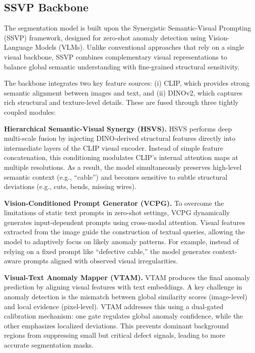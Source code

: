 \documentclass[11pt]{article}
\begin{document}
\subsection{SSVP Backbone}

The segmentation model is built upon the Synergistic Semantic-Visual Prompting (SSVP) framework, designed for zero-shot anomaly detection using Vision-Language Models (VLMs). Unlike conventional approaches that rely on a single visual backbone, SSVP combines complementary visual representations to balance global semantic understanding with fine-grained structural sensitivity.

The backbone integrates two key feature sources: (i) CLIP, which provides strong semantic alignment between images and text, and (ii) DINOv2, which captures rich structural and texture-level details. These are fused through three tightly coupled modules:

\textbf{Hierarchical Semantic-Visual Synergy (HSVS).}
HSVS performs deep multi-scale fusion by injecting DINO-derived structural features directly into intermediate layers of the CLIP visual encoder. Instead of simple feature concatenation, this conditioning modulates CLIP’s internal attention maps at multiple resolutions. As a result, the model simultaneously preserves high-level semantic context (e.g., “cable”) and becomes sensitive to subtle structural deviations (e.g., cuts, bends, missing wires).

\textbf{Vision-Conditioned Prompt Generator (VCPG).}
To overcome the limitations of static text prompts in zero-shot settings, VCPG dynamically generates input-dependent prompts using cross-modal attention. Visual features extracted from the image guide the construction of textual queries, allowing the model to adaptively focus on likely anomaly patterns. For example, instead of relying on a fixed prompt like “defective cable,” the model generates context-aware prompts aligned with observed visual irregularities.

\textbf{Visual-Text Anomaly Mapper (VTAM).}
VTAM produces the final anomaly prediction by aligning visual features with text embeddings. A key challenge in anomaly detection is the mismatch between global similarity scores (image-level) and local evidence (pixel-level). VTAM addresses this using a dual-gated calibration mechanism: one gate regulates global anomaly confidence, while the other emphasizes localized deviations. This prevents dominant background regions from suppressing small but critical defect signals, leading to more accurate segmentation masks.
\end{document}
